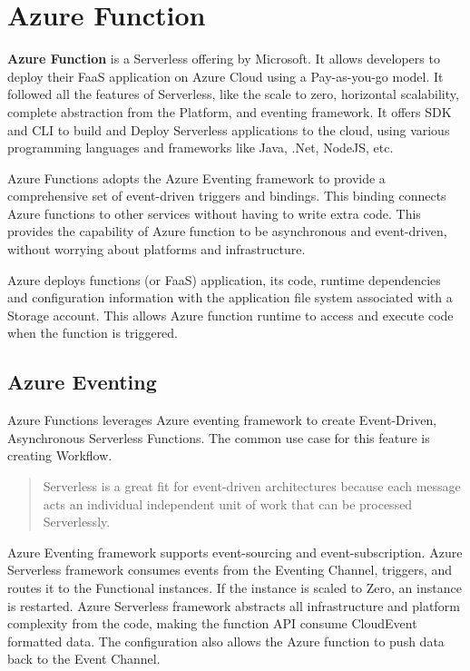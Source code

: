 \documentclass[12pt]{article}
\begin{document}
\section{Azure Function}
\begin{flushleft}
\textbf{Azure Function} is a Serverless offering by Microsoft. It allows developers to deploy their FaaS application on Azure Cloud using a Pay-as-you-go model. It followed all the features of Serverless, like the scale to zero, horizontal scalability, complete abstraction from the Platform, and eventing framework. It offers SDK and CLI to build and Deploy Serverless applications to the cloud, using various programming languages and frameworks like Java, .Net, NodeJS, etc.

Azure Functions adopts the Azure Eventing framework to provide a comprehensive set of event-driven triggers and bindings. This binding connects Azure functions to other services without having to write extra code. This provides the capability of Azure function to be asynchronous and event-driven, without worrying about platforms and infrastructure.

Azure deploys functions (or FaaS) application, its code, runtime dependencies and configuration information with the application file system associated with a Storage account. This allows Azure function runtime to access and execute code when the function is triggered. 

\subsection{Azure Eventing}
Azure Functions leverages Azure eventing framework to create Event-Driven, Asynchronous Serverless Functions. The common use case for this feature is creating Workflow. 
\begin{quote}
    Serverless is a great fit for event-driven architectures because each message acts an individual independent unit of work that can be processed Serverlessly. \cite{ANDERSON_2024}
\end{quote}

Azure Eventing framework supports event-sourcing and event-subscription. Azure Serverless framework consumes events from the Eventing Channel, triggers, and routes it to the Functional instances. If the instance is scaled to Zero, an instance is restarted. Azure Serverless framework abstracts all infrastructure and platform complexity from the code, making the function API consume CloudEvent formatted data. The configuration also allows the Azure function to push data back to the Event Channel.


\end{flushleft}
\end{document}
